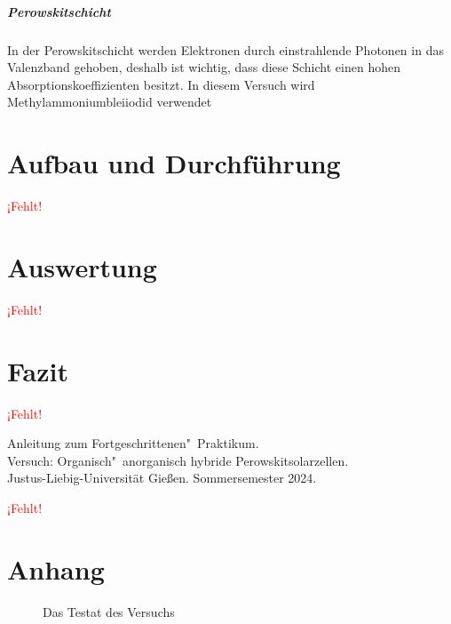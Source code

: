 \documentclass[12pt,a4paper,ngerman]{report}
\providecommand{\fehlt}{\textcolor{red}{{ ¡Fehlt! }}}
\begin{document}
	\paragraph{Perowskitschicht}
	In der Perowskitschicht werden Elektronen durch einstrahlende Photonen in das Valenzband gehoben, deshalb ist wichtig, dass diese Schicht einen hohen Absorptionskoeffizienten besitzt. In diesem Versuch wird Methylammoniumbleiiodid  verwendet
		



	

\chapter{Aufbau und Durchführung}
	\fehlt
	
	


\chapter{Auswertung}
	\fehlt
\chapter{Fazit}
	\fehlt

\listoffigures%
	
\begin{thebibliography}{111}%
	Anleitung zum Fortgeschrittenen"~Praktikum.\\ \glqq Versuch: Organisch"~anorganisch hybride Perowskitsolarzellen\grqq.\\ Justus-Liebig-Universität Gießen. Sommersemester 2024.
	
		\fehlt
	\end{thebibliography}


\chapter*{Anhang}\label{ch:Anhang}
\FloatBarrier
	\begin{figure}[ht]
	\centering
	\caption[Testat]{Das Testat des Versuchs}
	\label{fig:Testat}
\end{figure}
\end{document}
